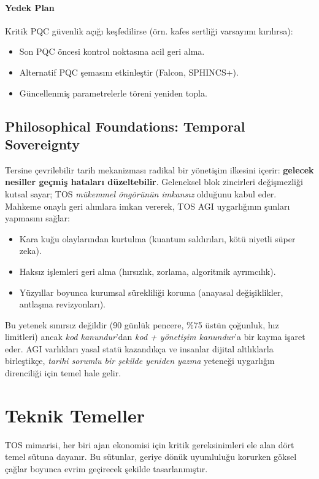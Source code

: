 \documentclass[11pt]{article}
\begin{document}
\paragraph{Yedek Plan}
Kritik PQC güvenlik açığı keşfedilirse (örn. kafes sertliği varsayımı kırılırsa):
\begin{itemize}[noitemsep]
  \item Son PQC öncesi kontrol noktasına acil geri alma.
  \item Alternatif PQC şemasını etkinleştir (Falcon, SPHINCS+).
  \item Güncellenmiş parametrelerle töreni yeniden topla.
\end{itemize}

\subsection{Philosophical Foundations: Temporal Sovereignty}

Tersine çevrilebilir tarih mekanizması radikal bir yönetişim ilkesini içerir: \textbf{gelecek nesiller geçmiş hataları düzeltebilir}. Geleneksel blok zincirleri değişmezliği kutsal sayar; TOS \emph{mükemmel öngörünün imkansız} olduğunu kabul eder. Mahkeme onaylı geri alımlara imkan vererek, TOS AGI uygarlığının şunları yapmasını sağlar:
\begin{itemize}[noitemsep]
  \item Kara kuğu olaylarından kurtulma (kuantum saldırıları, kötü niyetli süper zeka).
  \item Haksız işlemleri geri alma (hırsızlık, zorlama, algoritmik ayrımcılık).
  \item Yüzyıllar boyunca kurumsal sürekliliği koruma (anayasal değişiklikler, antlaşma revizyonları).
\end{itemize}

Bu yetenek sınırsız değildir (90 günlük pencere, \%75 üstün çoğunluk, hız limitleri) ancak \emph{kod kanundur}'dan \emph{kod + yönetişim kanundur}'a bir kayma işaret eder. AGI varlıkları yasal statü kazandıkça ve insanlar dijital altlıklarla birleştikçe, \emph{tarihi sorumlu bir şekilde yeniden yazma} yeteneği uygarlığın direnciliği için temel hale gelir.

\section{Teknik Temeller}

TOS mimarisi, her biri ajan ekonomisi için kritik gereksinimleri ele alan dört temel sütuna dayanır. Bu sütunlar, geriye dönük uyumluluğu korurken göksel çağlar boyunca evrim geçirecek şekilde tasarlanmıştır.
\end{document}
